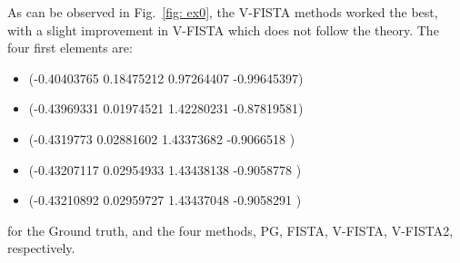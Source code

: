 %
As can be observed in Fig.~\ref{fig: ex0}, the V-FISTA 
methods worked the best, with a slight improvement in 
V-FISTA which does not follow the theory.
The four first elements are:
\begin{itemize}
    \item (-0.40403765  0.18475212  0.97264407 -0.99645397)
    \item (-0.43969331  0.01974521  1.42280231 -0.87819581)
    \item (-0.4319773   0.02881602  1.43373682 -0.9066518 )
    \item (-0.43207117  0.02954933  1.43438138 -0.9058778 )
    \item (-0.43210892  0.02959727  1.43437048 -0.9058291 )
\end{itemize}
%
for the Ground truth, and the four methods, PG, FISTA,
V-FISTA, V-FISTA2, respectively.